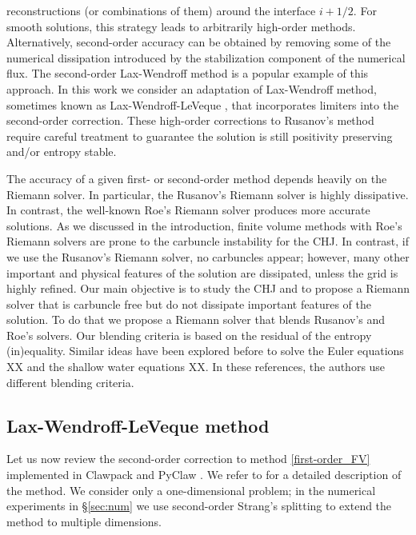 \documentclass[preprint, 11pt]{article}
\begin{document}
reconstructions (or combinations of them) around the interface $i+1/2$. 
For smooth solutions, this strategy leads to arbitrarily high-order
methods. Alternatively, second-order accuracy can be obtained by removing some of the 
numerical dissipation introduced by the stabilization component of the numerical flux. 
The second-order Lax-Wendroff method \cite{lax1959systems} is a popular example of this approach. 
In this work we consider an adaptation of Lax-Wendroff method,
sometimes known as Lax-Wendroff-LeVeque \cite{leveque1997wave,leveque2002finite}, 
that incorporates limiters into the second-order correction. 
These high-order corrections to Rusanov's method require careful treatment to guarantee 
the solution is still positivity preserving and/or entropy stable. 

The accuracy of a given first- or second-order method depends heavily on the Riemann solver. 
In particular, the Rusanov's Riemann solver is highly dissipative. In contrast, the well-known 
Roe's Riemann solver produces more accurate solutions. 
%
As we discussed in the introduction, finite volume methods with 
Roe's Riemann solvers are prone to the carbuncle instability for the CHJ. 
In contrast, if we use the Rusanov's 
Riemann solver, no carbuncles appear; however, many other important and physical features of 
the solution are dissipated, unless the grid is highly refined. 
Our main objective is to study the CHJ and to propose a Riemann solver
that is carbuncle free but do not dissipate important features of the solution. 
To do that we propose a Riemann solver that blends Rusanov's and Roe's solvers. 
Our blending criteria is based on the residual of the entropy (in)equality. 
Similar ideas have been explored before to solve the Euler equations XX 
and the shallow water equations XX. In these references, the authors use different 
blending criteria. 

\subsection{Lax-Wendroff-LeVeque method}
Let us now review the second-order correction to method \eqref{first-order_FV} implemented in 
Clawpack \cite{clawpack} and PyClaw \cite{pyclaw-sisc}.
We refer to \cite{leveque1997wave, leveque2002finite} for a detailed description of the method. 
We consider only a one-dimensional problem; in the 
numerical experiments in \S\ref{sec:num} we use second-order Strang's splitting \cite{strang1968construction} 
to extend the method to multiple dimensions. 
\end{document}
